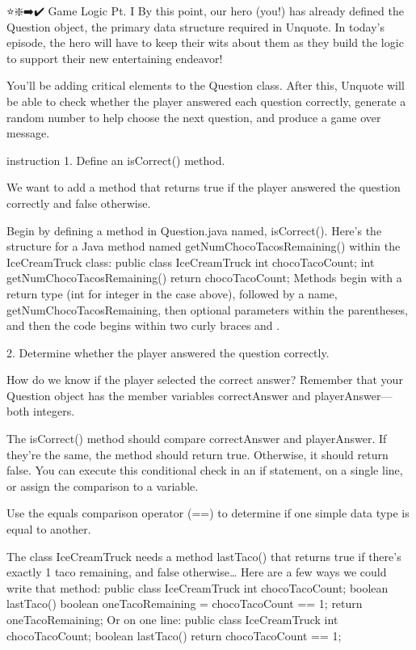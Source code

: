 ⭐❇️➡️✔️
Game Logic Pt. I
    By this point, our hero (you!) has already defined the Question object, the primary data structure required in Unquote. In today’s episode, the hero will have to keep their wits about them as they build the logic to support their new entertaining endeavor!

    You’ll be adding critical elements to the Question class. After this, Unquote will be able to check whether the player answered each question correctly, generate a random number to help choose the next question, and produce a game over message.

instruction
    1.
    Define an isCorrect() method.

    We want to add a method that returns true if the player answered the question correctly and false otherwise.

    Begin by defining a method in Question.java named, isCorrect().
        Here’s the structure for a Java method named getNumChocoTacosRemaining() within the IceCreamTruck class:
            public class IceCreamTruck {
                int chocoTacoCount;    
                int getNumChocoTacosRemaining() {
                    return chocoTacoCount;
                }
            }
        Methods begin with a return type (int for integer in the case above), followed by a name, getNumChocoTacosRemaining, then optional parameters within the parentheses, and then the code begins within two curly braces { and }.

    2.
    Determine whether the player answered the question correctly.

    How do we know if the player selected the correct answer? Remember that your Question object has the member variables correctAnswer and playerAnswer—both integers.

    The isCorrect() method should compare correctAnswer and playerAnswer. If they’re the same, the method should return true. Otherwise, it should return false.
        You can execute this conditional check in an if statement, on a single line, or assign the comparison to a variable.

        Use the equals comparison operator (==) to determine if one simple data type is equal to another.

        The class IceCreamTruck needs a method lastTaco() that returns true if there’s exactly 1 taco remaining, and false otherwise… Here are a few ways we could write that method:
            public class IceCreamTruck {
                int chocoTacoCount;
                boolean lastTaco() {
                    boolean oneTacoRemaining = chocoTacoCount == 1;
                    return oneTacoRemaining;
                }
            }
        Or on one line:
            public class IceCreamTruck {
                int chocoTacoCount;
                boolean lastTaco() {
                    return chocoTacoCount == 1;
                }
            }

